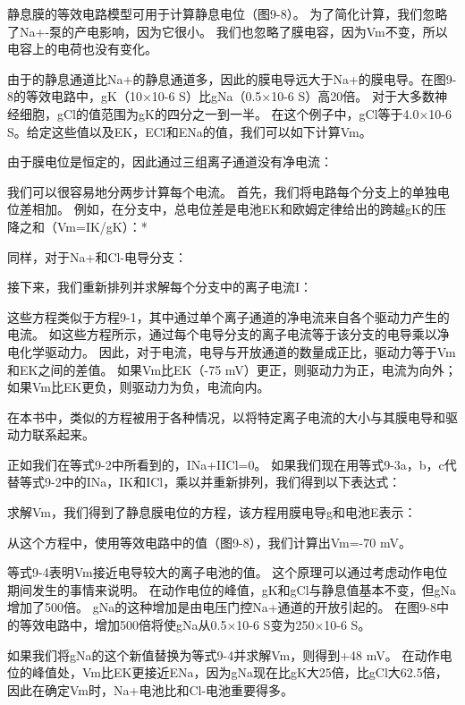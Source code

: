 \begin{proposition}[利用等效电路模型计算静息膜电位] \label{box:9_2}
	
	\quad \quad 静息膜的等效电路模型可用于计算静息电位（图9-8）。
	为了简化计算，我们忽略了Na+-泵的产电影响，因为它很小。
	我们也忽略了膜电容，因为Vm不变，所以电容上的电荷也没有变化。
	
	\quad \quad 由于的静息通道比Na+的静息通道多，因此的膜电导远大于Na+的膜电导。在图9-8的等效电路中，gK（10×10-6 S）比gNa（0.5×10-6 S）高20倍。
	对于大多数神经细胞，gCl的值范围为gK的四分之一到一半。
	在这个例子中，gCl等于4.0×10-6 S。给定这些值以及EK，ECl和ENa的值，我们可以如下计算Vm。
	
	\quad \quad 由于膜电位是恒定的，因此通过三组离子通道没有净电流：
	
	\quad \quad 我们可以很容易地分两步计算每个电流。
	首先，我们将电路每个分支上的单独电位差相加。
	例如，在分支中，总电位差是电池EK和欧姆定律给出的跨越gK的压降之和（Vm=IK/gK）：*
	
	\quad \quad 同样，对于Na+和Cl-电导分支：
	
	\quad \quad 接下来，我们重新排列并求解每个分支中的离子电流I：
	
	\quad \quad 这些方程类似于方程9-1，其中通过单个离子通道的净电流来自各个驱动力产生的电流。
	如这些方程所示，通过每个电导分支的离子电流等于该分支的电导乘以净电化学驱动力。
	因此，对于电流，电导与开放通道的数量成正比，驱动力等于Vm和EK之间的差值。
	如果Vm比EK（-75 mV）更正，则驱动力为正，电流为向外；
	如果Vm比EK更负，则驱动力为负，电流向内。
	
	\quad \quad 在本书中，类似的方程被用于各种情况，以将特定离子电流的大小与其膜电导和驱动力联系起来。
	
	\quad \quad 正如我们在等式9-2中所看到的，INa+IICl=0。
	如果我们现在用等式9-3a，b，c代替等式9-2中的INa，IK和ICl，乘以并重新排列，我们得到以下表达式：
	
	\quad \quad 求解Vm，我们得到了静息膜电位的方程，该方程用膜电导g和电池E表示：
	
	\quad \quad 从这个方程中，使用等效电路中的值（图9-8），我们计算出Vm=-70 mV。
	
	\quad \quad 等式9-4表明Vm接近电导较大的离子电池的值。
	这个原理可以通过考虑动作电位期间发生的事情来说明。
	在动作电位的峰值，gK和gCl与静息值基本不变，但gNa增加了500倍。
	gNa的这种增加是由电压门控Na+通道的开放引起的。
	在图9-8中的等效电路中，增加500倍将使gNa从0.5×10-6 S变为250×10-6 S。
	
	\quad \quad 如果我们将gNa的这个新值替换为等式9-4并求解Vm，则得到+48 mV。
	在动作电位的峰值处，Vm比EK更接近ENa，因为gNa现在比gK大25倍，比gCl大62.5倍，因此在确定Vm时，Na+电池比和Cl-电池重要得多。
	

\end{proposition}
